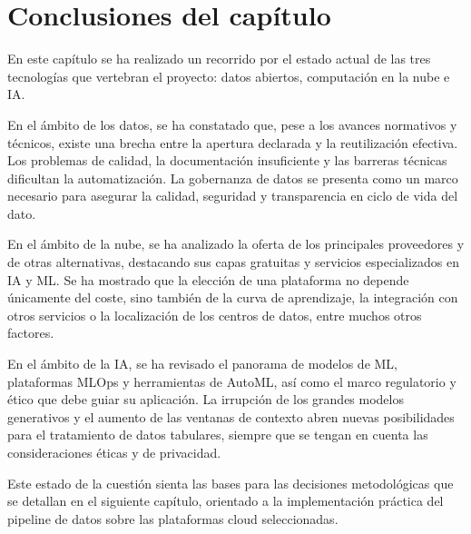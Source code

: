 \section{Conclusiones del capítulo}

En este capítulo se ha realizado un recorrido por el estado actual de las tres tecnologías que vertebran el proyecto: datos abiertos, computación en la nube e IA. 

En el ámbito de los datos, se ha constatado que, pese a los avances normativos y técnicos, existe una brecha entre la apertura declarada y la reutilización efectiva. Los problemas de calidad, la documentación insuficiente y las barreras técnicas dificultan la automatización. La gobernanza de datos se presenta como un marco necesario para asegurar la  calidad, seguridad y transparencia en ciclo de vida del dato.

En el ámbito de la nube, se ha analizado la oferta de los principales proveedores y de otras alternativas, destacando sus capas gratuitas y servicios especializados en IA y ML. Se ha mostrado que la elección de una plataforma no depende únicamente del coste, sino también de la curva de aprendizaje, la integración con otros servicios o la localización de los centros de datos,  entre muchos otros factores.

En el ámbito de la IA, se ha revisado el panorama de modelos de ML, plataformas MLOps y herramientas de AutoML, así como el marco regulatorio y ético que debe guiar su aplicación. La irrupción de los grandes modelos generativos y el aumento de las ventanas de contexto abren nuevas posibilidades para el tratamiento de datos tabulares, siempre que se tengan en cuenta las consideraciones éticas y de privacidad.

Este estado de la cuestión sienta las bases para las decisiones metodológicas que se detallan en el siguiente capítulo, orientado a la implementación práctica del pipeline de datos sobre las plataformas cloud seleccionadas.